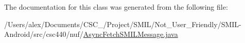 The documentation for this class was generated from the following file\-:\begin{DoxyCompactItemize}
\item 
/\-Users/alex/\-Documents/\-C\-S\-C\-\_/\-Project/\-S\-M\-I\-L/\-Not\-\_\-\-User\-\_\-\-Friendly/\-S\-M\-I\-L-\/\-Android/src/csc440/nuf/\hyperlink{_async_fetch_s_m_i_l_message_8java}{Async\-Fetch\-S\-M\-I\-L\-Message.\-java}\end{DoxyCompactItemize}
